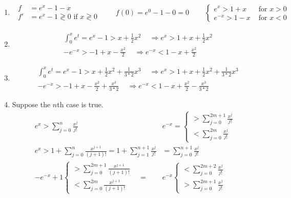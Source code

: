 \documentclass[twoside]{amsart}
\theoremstyle{plain}
\theoremstyle{definition}
\newcommand{\exercisehead}[1]
  {\smallskip
   \noindent{\small\bf Exercise #1.}}
\begin{document}
\exercisehead{41}
\begin{enumerate}
\item 
\[
\begin{gathered}
  \begin{aligned}
    f & = e^x - 1 - x \\
    f' & = e^x - 1 \gtrless 0 \text{ if } x \gtrless 0 
  \end{aligned}
\quad \quad \, 
f(0) = e^0 - 1 - 0 = 0 
\quad \quad \, \begin{cases}
    e^x > 1 + x & \text{ for } x > 0  \\
   e^{-x} > 1 - x & \text{ for } x < 0 
\end{cases} 
\end{gathered}
\]
\item 
  \[
\begin{aligned}
  & \int_0^x e^t = e^x - 1 > x + \frac{1}{2}x^2 \quad \, \Longrightarrow e^{x} > 1 + x + \frac{1}{2} x^2 \\
  & -e^{-x} > -1 + x - \frac{x^2}{2} \quad \, \Longrightarrow e^{-x} < 1 - x + \frac{x^2}{2}
\end{aligned}
\]
\item
\[
\begin{aligned}
  & \int_0^x e^t = e^x - 1 > x + \frac{1}{2}x^2 + \frac{1}{3*2} x^3 \quad \, \Longrightarrow e^{x} > 1 + x + \frac{1}{2} x^2 + \frac{1}{3*2} x^3 \\
  & -e^{-x} > -1 + x - \frac{x^2}{2} + \frac{x^3}{3*2} \quad \, \Longrightarrow e^{-x} < 1 - x + \frac{x^2}{2} - \frac{x^3}{3*2}
\end{aligned}
\]
\item Suppose the $n$th case is true.  
\[
\begin{aligned}
&  e^x > \sum_{j=0}^n \frac{x^j}{j! } \quad \quad \, & e^{-x}  = \begin{cases} > \sum_{j=0}^{2m+1} \frac{x^j}{j!} & \\
    < \sum_{j=0}^{2m} \frac{x^j}{j! } & \end{cases} \\
& e^x > 1 + \sum_{j=0}^n \frac{x^{j+1}}{ (j+1)! } = 1 + \sum_{j=1}^{n+1} \frac{x^j}{j!} & = \sum_{j=0}^{n+1} \frac{x^j}{j!} \\ 
& -e^{-x} + 1 \begin{cases} > \sum_{j=0}^{2m+1} \frac{x^{j+1}}{ (j+1)! } & \\
    < \sum_{j=0}^{2m} \frac{x^{j+1}}{(j+1)!} & \end{cases} = & e^{-x} \begin{cases} < \sum_{j=0}^{2m+2} \frac{x^j}{j!} & \\
    > \sum_{j=0}^{2m+1} \frac{x^j}{j!} & \end{cases} 
\end{aligned}
\]
\end{enumerate}
\end{document}

